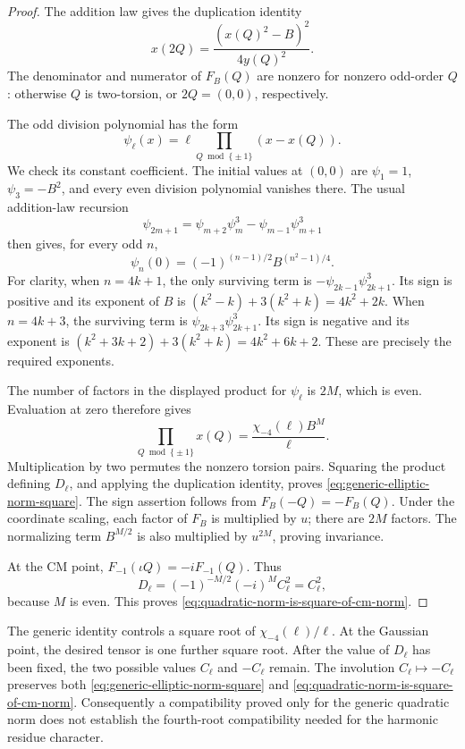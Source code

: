 \begin{proof}
The addition law gives the duplication identity
\[
                         x(2Q)=\frac{(x(Q)^2-B)^2}{4y(Q)^2}.
\]
The denominator and numerator of \(F_B(Q)\) are nonzero
for nonzero odd-order \(Q\): otherwise \(Q\) is
two-torsion, or \(2Q=(0,0)\), respectively.

The odd division polynomial has the form
\[
                \psi_\ell(x)=\ell
                      \prod_{Q\bmod\{\pm1\}}(x-x(Q)).
\]
We check its constant coefficient.  The initial values at
\((0,0)\) are \(\psi_1=1\), \(\psi_3=-B^2\), and
every even division polynomial vanishes there.  The usual
addition-law recursion
\[
             \psi_{2m+1}=\psi_{m+2}\psi_m^3
                              -\psi_{m-1}\psi_{m+1}^3
\]
then gives, for every odd \(n\),
\[
                         \psi_n(0)=(-1)^{(n-1)/2}B^{(n^2-1)/4}.
\]
For clarity, when \(n=4k+1\), the only surviving term is
\(-\psi_{2k-1}\psi_{2k+1}^3\).  Its sign is positive
and its exponent of \(B\) is
\((k^2-k)+3(k^2+k)=4k^2+2k\).
When \(n=4k+3\), the surviving term is
\(\psi_{2k+3}\psi_{2k+1}^3\).  Its sign is negative
and its exponent is
\((k^2+3k+2)+3(k^2+k)=4k^2+6k+2\).
These are precisely the required exponents.

The number of factors in the displayed product for
\(\psi_\ell\) is \(2M\), which is even.  Evaluation
at zero therefore gives
\[
                    \prod_{Q\bmod\{\pm1\}}x(Q)
                         =\frac{\chi_{-4}(\ell)B^M}{\ell}.
\]
Multiplication by two permutes the nonzero torsion pairs.
Squaring the product defining \(D_\ell\), and applying
the duplication identity, proves
\eqref{eq:generic-elliptic-norm-square}.
The sign assertion follows from \(F_B(-Q)=-F_B(Q)\).
Under the coordinate scaling, each factor of \(F_B\)
is multiplied by \(u\); there are \(2M\) factors.
The normalizing term \(B^{M/2}\) is also multiplied
by \(u^{2M}\), proving invariance.

At the CM point,
\(F_{-1}(\iota Q)=-iF_{-1}(Q)\).  Thus
\[
 D_\ell=(-1)^{-M/2}(-i)^M C_\ell^2=C_\ell^2,
\]
because \(M\) is even.  This proves
\eqref{eq:quadratic-norm-is-square-of-cm-norm}.
\end{proof}

The generic identity controls a square root of
\(\chi_{-4}(\ell)/\ell\).  At the Gaussian point,
the desired tensor is one further square root.
After the value of \(D_\ell\) has been fixed, the two
possible values \(C_\ell\) and \(-C_\ell\) remain.
The involution \(C_\ell\mapsto-C_\ell\) preserves
both \eqref{eq:generic-elliptic-norm-square} and
\eqref{eq:quadratic-norm-is-square-of-cm-norm}.
Consequently a compatibility proved only for the generic
quadratic norm does not establish the fourth-root
compatibility needed for the harmonic residue character.


